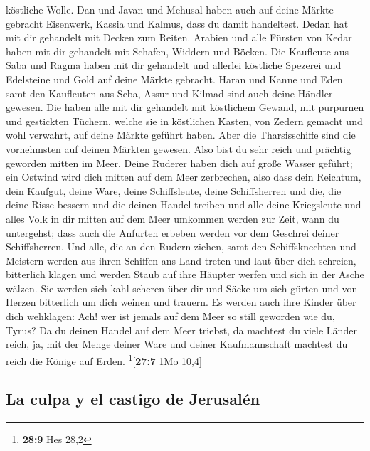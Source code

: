 köstliche Wolle.  Dan und Javan und Mehusal haben auch
auf deine Märkte gebracht Eisenwerk, Kassia und Kalmus, dass du damit
handeltest.  Dedan hat mit dir gehandelt mit Decken zum
Reiten.  Arabien und alle Fürsten von Kedar haben mit dir
gehandelt mit Schafen, Widdern und Böcken.  Die Kaufleute
aus Saba und Ragma haben mit dir gehandelt und allerlei köstliche
Spezerei und Edelsteine und Gold auf deine Märkte gebracht.
 Haran und Kanne und Eden samt den Kaufleuten aus Seba,
Assur und Kilmad sind auch deine Händler gewesen.  Die
haben alle mit dir gehandelt mit köstlichem Gewand, mit purpurnen und
gestickten Tüchern, welche sie in köstlichen Kasten, von Zedern gemacht
und wohl verwahrt, auf deine Märkte geführt haben.  Aber
die Tharsisschiffe sind die vornehmsten auf deinen Märkten gewesen. Also
bist du sehr reich und prächtig geworden mitten im Meer. 
Deine Ruderer haben dich auf große Wasser geführt; ein Ostwind wird dich
mitten auf dem Meer zerbrechen,  also dass dein Reichtum,
dein Kaufgut, deine Ware, deine Schiffsleute, deine Schiffsherren und
die, die deine Risse bessern und die deinen Handel treiben und alle
deine Kriegsleute und alles Volk in dir mitten auf dem Meer umkommen
werden zur Zeit, wann du untergehst;  dass auch die
Anfurten erbeben werden vor dem Geschrei deiner Schiffsherren.
 Und alle, die an den Rudern ziehen, samt den
Schiffsknechten und Meistern werden aus ihren Schiffen ans Land treten
 und laut über dich schreien, bitterlich klagen und
werden Staub auf ihre Häupter werfen und sich in der Asche wälzen.
 Sie werden sich kahl scheren über dir und Säcke um sich
gürten und von Herzen bitterlich um dich weinen und trauern.
 Es werden auch ihre Kinder über dich wehklagen: Ach! wer
ist jemals auf dem Meer so still geworden wie du, Tyrus? 
Da du deinen Handel auf dem Meer triebst, da machtest du viele Länder
reich, ja, mit der Menge deiner Ware und deiner Kaufmannschaft machtest
du reich die Könige auf Erden. \footnote{\textbf{28:9} Hes 28,2}{[}\textbf{27:7}
1Mo 10,4{]}

\hypertarget{la-culpa-y-el-castigo-de-jerusaluxe9n}{%
\subsection{La culpa y el castigo de
Jerusalén}\label{la-culpa-y-el-castigo-de-jerusaluxe9n}}


